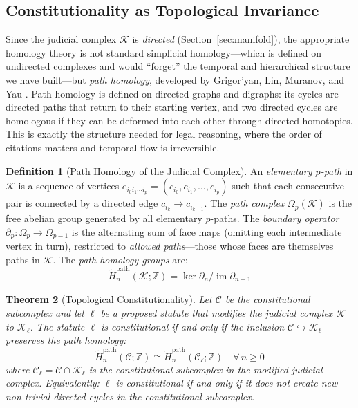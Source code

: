 \documentclass[12pt]{article}
\newtheorem{theorem}{Theorem}[section]
\theoremstyle{definition}
\newtheorem{definition}[theorem]{Definition}
\theoremstyle{remark}
\newcommand{\C}{\mathcal{C}}               %
\newcommand{\Z}{\mathbb{Z}}
\begin{document}
\subsection{Constitutionality as Topological Invariance}

Since the judicial complex $\mathcal{K}$ is \emph{directed} (Section~\ref{sec:manifold}), the appropriate homology theory is not standard simplicial homology---which is defined on undirected complexes and would ``forget'' the temporal and hierarchical structure we have built---but \emph{path homology}, developed by Grigor'yan, Lin, Muranov, and Yau \cite{grigoryan2012,grigoryan2014}.  Path homology is defined on directed graphs and digraphs: its cycles are directed paths that return to their starting vertex, and two directed cycles are homologous if they can be deformed into each other through directed homotopies.  This is exactly the structure needed for legal reasoning, where the order of citations matters and temporal flow is irreversible.

\begin{definition}[Path Homology of the Judicial Complex]
\label{def:path_homology}
An \emph{elementary $p$-path} in $\mathcal{K}$ is a sequence of vertices $e_{i_0 i_1 \cdots i_p} = (c_{i_0}, c_{i_1}, \ldots, c_{i_p})$ such that each consecutive pair is connected by a directed edge $c_{i_k} \to c_{i_{k+1}}$.  The \emph{path complex} $\Omega_p(\mathcal{K})$ is the free abelian group generated by all elementary $p$-paths.  The \emph{boundary operator} $\partial_p: \Omega_p \to \Omega_{p-1}$ is the alternating sum of face maps (omitting each intermediate vertex in turn), restricted to \emph{allowed paths}---those whose faces are themselves paths in $\mathcal{K}$.  The \emph{path homology groups} are:
\begin{equation}
\widetilde{H}_n^{\text{path}}(\mathcal{K}; \Z) = \ker \partial_n / \operatorname{im} \partial_{n+1}
\label{eq:path_homology}
\end{equation}
\end{definition}

\begin{theorem}[Topological Constitutionality]
\label{thm:topological_const}
Let $\C$ be the constitutional subcomplex and let $\ell$ be a proposed statute that modifies the judicial complex $\mathcal{K}$ to $\mathcal{K}_\ell$.  The statute $\ell$ is \emph{constitutional} if and only if the inclusion $\C \hookrightarrow \mathcal{K}_\ell$ preserves the path homology:
\begin{equation}
\widetilde{H}_n^{\text{path}}(\C; \Z) \cong \widetilde{H}_n^{\text{path}}(\C_\ell; \Z) \quad \forall\, n \geq 0
\label{eq:const_test}
\end{equation}
where $\C_\ell = \C \cap \mathcal{K}_\ell$ is the constitutional subcomplex in the modified judicial complex.  Equivalently: $\ell$ is constitutional if and only if it does not create new non-trivial \emph{directed} cycles in the constitutional subcomplex.
\end{theorem}
\end{document}
